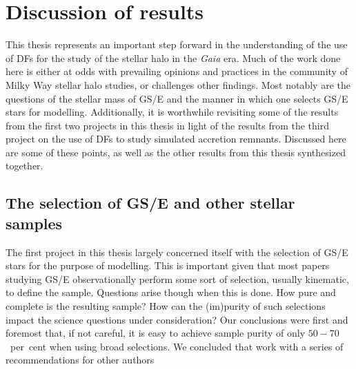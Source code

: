 \section{Discussion of results}

This thesis represents an important step forward in the understanding of the use of DFs for the study of the stellar halo in the \textit{Gaia} era. Much of the work done here is either at odds with prevailing opinions and practices in the community of Milky Way stellar halo studies, or challenges other findings. Most notably are the questions of the stellar mass of GS/E and the manner in which one selects GS/E stars for modelling. Additionally, it is worthwhile revisiting some of the results from the first two projects in this thesis in light of the results from the third project on the use of DFs to study simulated accretion remnants. Discussed here are some of these points, as well as the other results from this thesis synthesized together.


\subsection{The selection of GS/E and other stellar samples}

The first project in this thesis largely concerned itself with the selection of GS/E stars for the purpose of modelling. This is important given that most papers studying GS/E observationally perform some sort of selection, usually kinematic, to define the sample. Questions arise though when this is done. How pure and complete is the resulting sample? How can the (im)purity of such selections impact the science questions under consideration? Our conclusions were first and foremost that, if not careful, it is easy to achieve sample purity of only $50-70$~per~cent when using broad selections. We concluded that work with a series of recommendations for other authors 

